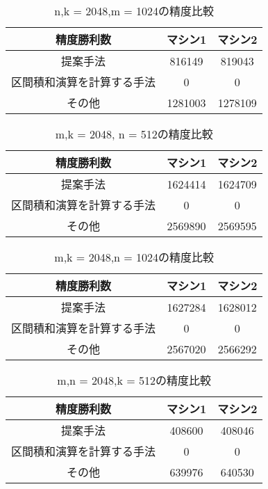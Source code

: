 \documentclass[11pt,a4paper]{jsreport}
\theoremstyle{definition}
\begin{document}
\begin{table}[H]
\centering
\small
\caption{n,k = 2048,m = 1024の精度比較}
\begin{tabular}{c|c|c}
\hline
精度勝利数 & マシン1 & マシン2\\ \hline \hline
提案手法 & 816149 & 819043 \\ \hline
区間積和演算を計算する手法 & 0 & 0 \\ \hline
その他 & 1281003 & 1278109 \\ \hline
\end{tabular}
\end{table}

\begin{table}[H]
\centering
\small
\caption{m,k = 2048, n = 512の精度比較}
\begin{tabular}{c|c|c}
\hline
精度勝利数 & マシン1 & マシン2\\ \hline \hline
提案手法 & 1624414 & 1624709 \\ \hline
区間積和演算を計算する手法 & 0 & 0 \\ \hline
その他 & 2569890 & 2569595 \\ \hline
\end{tabular}
\end{table}

\begin{table}[H]
\centering
\small
\caption{m,k = 2048,n = 1024の精度比較}
\begin{tabular}{c|c|c}
\hline
精度勝利数 & マシン1 & マシン2 \\ \hline \hline
提案手法 & 1627284 & 1628012 \\ \hline
区間積和演算を計算する手法 & 0 & 0 \\ \hline
その他 & 2567020 & 2566292 \\ \hline
\end{tabular}
\end{table}

\begin{table}[H]
\centering
\small
\caption{m,n = 2048,k = 512の精度比較}
\begin{tabular}{c|c|c}
\hline
精度勝利数 & マシン1 & マシン2\\ \hline \hline
提案手法 & 408600 & 408046 \\ \hline
区間積和演算を計算する手法 & 0 & 0 \\ \hline
その他 & 639976 & 640530 \\ \hline
\end{tabular}
\end{table}
\end{document}
